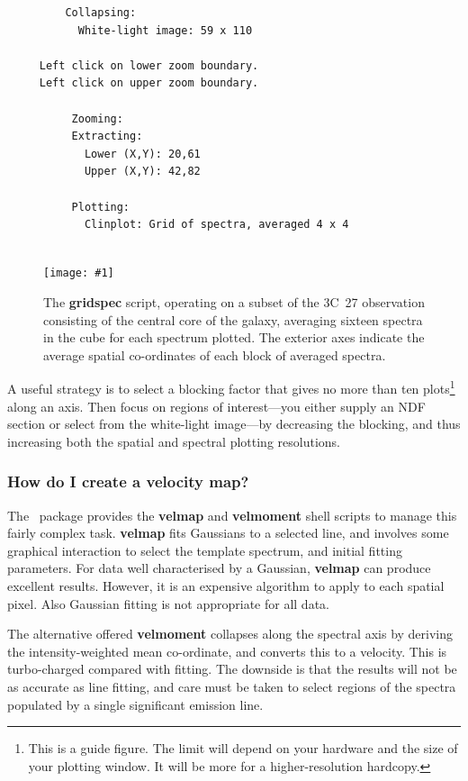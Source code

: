 \documentclass[twoside,11pt]{article}
\newcommand{\htmladdimg}[1]{}
\newcommand{\xref}[3]{#1}
\newcommand{\xlabel}[1]{}
\newcommand{\myfig} [5] {
  \begin{figure}
    \centering\texttt{[image: \#1]}
    \typeout{#1 inserted on page \arabic{page}}
    \caption{\label{#4}#5}
  \end{figure}
  }
\newcommand{\myfig}[5]{
    \label{#4} \htmladdimg{#3}\\
    Figure: #5\\
    }
\begin{document}
{\begin{verbatim}
         Collapsing:
           White-light image: 59 x 110

     Left click on lower zoom boundary.
     Left click on upper zoom boundary.

          Zooming:
          Extracting:
            Lower (X,Y): 20,61
            Upper (X,Y): 42,82

          Plotting:
            Clinplot: Grid of spectra, averaged 4 x 4
               
\end{verbatim}\normalsize

\myfig{sc16_gridspec.eps}{height=0.4\textheight}{sc16_gridspec.gif}{sc16_gridspec_fig}{The
{\bf gridspec} script, operating on a subset of the 3C~27 observation
consisting of the central core of the galaxy, averaging sixteen
spectra in the cube for each spectrum plotted.  The exterior axes
indicate the average spatial co-ordinates of each block of averaged
spectra.}

A useful strategy is to select a blocking factor that gives no more
than ten plots\footnote{This is a guide figure.  The limit will
depend on your hardware and the size of your plotting window.  It will
be more for a higher-resolution hardcopy.} along an axis.  Then focus
on regions of interest---you either supply an NDF section or select
from the white-light image---by decreasing the blocking, and thus
increasing both the spatial and spectral plotting resolutions.


\subsubsection{\label{sc16_velmap}How do I create a velocity map?\xlabel{sc16_velmap}}

The \DATACUBE\ package provides the \xref{{\bf
velmap}}{sun237}{velmap} and \xref{{\bf velmoment}}{sun237}{velmoment}
shell scripts to manage this fairly complex task.  {\bf velmap} fits
Gaussians to a selected line, and involves some graphical interaction
to select the template spectrum, and initial fitting parameters. For
data well characterised by a Gaussian, {\bf velmap} can produce
excellent results.  However, it is an expensive algorithm to apply to
each spatial pixel.  Also Gaussian fitting is not appropriate for all
data. 

The alternative offered {\bf velmoment} collapses along the spectral
axis by deriving the intensity-weighted mean co-ordinate, and converts
this to a velocity.  This is turbo-charged compared with fitting.  The
downside is that the results will not be as accurate as line fitting,
and care must be taken to select regions of the spectra populated by a
single significant emission line.

}
\end{document}
